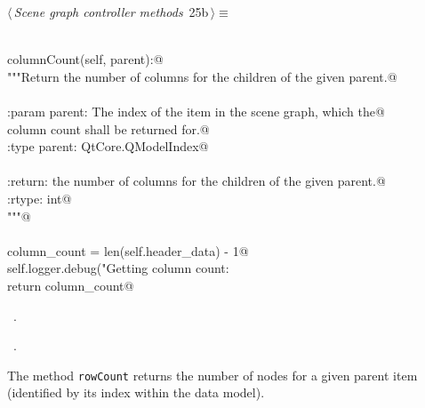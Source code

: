 \documentclass[
    a4paper,      %
    10pt,         %
    openright,    %
    notitlepage,  %
    parskip=half, %
]{scrreprt}       %
\theoremstyle{definition}                    %
\begin{document}
\begin{flushleft} \small
\begin{minipage}{\linewidth}\label{scrap24}\raggedright\small
{} $\langle\,${\itshape Scene graph controller methods}\nobreak\ {\footnotesize {25b}}$\,\rangle\equiv$
\vspace{-1exm}
\begin{list}{}{} \item
\mbox{}\lstinline@@\\
\mbox{}\lstinline@def columnCount(self, parent):@\\
\mbox{}\lstinline@    """Return the number of columns for the children of the given parent.@\\
\mbox{}\lstinline@@\\
\mbox{}\lstinline@    :param parent: The index of the item in the scene graph, which the@\\
\mbox{}\lstinline@                    column count shall be returned for.@\\
\mbox{}\lstinline@    :type  parent: QtCore.QModelIndex@\\
\mbox{}\lstinline@@\\
\mbox{}\lstinline@    :return: the number of columns for the children of the given parent.@\\
\mbox{}\lstinline@    :rtype:  int@\\
\mbox{}\lstinline@    """@\\
\mbox{}\lstinline@@\\
\mbox{}\lstinline@    column_count = len(self.header_data) - 1@\\
\mbox{}\lstinline@    self.logger.debug("Getting column count: %s", column_count)@\\
\mbox{}\lstinline@@\\
\mbox{}\lstinline@    return column_count@\\
\mbox{}\lstinline@@{\NWsep}
\end{list}
\vspace{-1.5ex}
\footnotesize
\begin{list}{}{\setlength{\itemsep}{-\parsep}\setlength{\itemindent}{-\leftmargin}}
\item \NWtxtMacroDefBy\ .
\item \NWtxtMacroRefIn\ .

\item{}
\end{list}
\end{minipage}\vspace{4ex}
\end{flushleft}
The method \verb+rowCount+ returns the number of nodes for a given parent
item (identified by its index within the data model).
\end{document}

